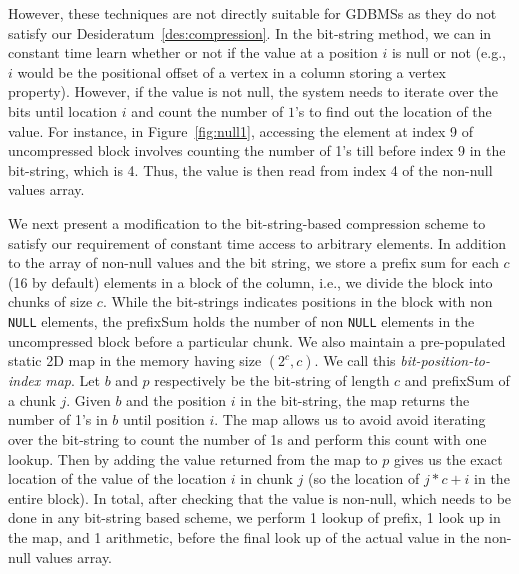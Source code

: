 However, these techniques are not directly suitable for GDBMSs as they do not satisfy our Desideratum~\ref{des:compression}. In the bit-string method, we can in constant time learn whether or not if the value at a position $i$ is null or not (e.g., $i$ would be the positional offset of a vertex in a column storing a vertex property). However, if the value is not null, the system needs to iterate over the bits until location $i$ and count the number of $1$'s to find out the location of the value. For instance, in Figure~\ref{fig:null1}, accessing the element at index 9 of uncompressed block involves counting the number of 1's till before index 9 in the bit-string, which is 4. Thus, the value is then read from index 4 of the non-null values array. 



We next present a modification to the bit-string-based compression scheme to satisfy our requirement of constant time access to arbitrary elements. In addition to the array of non-null values and the bit string, we store a prefix sum for each $c$ (16 by default) elements in a block of the column, i.e., we divide the block into chunks of size $c$. While the bit-strings indicates positions in the block with non \texttt{NULL} elements, the prefixSum holds the number of non \texttt{NULL} elements in the uncompressed block before a particular chunk. We also maintain a pre-populated static 2D map in the memory having size $(2^c, c)$. We call this \emph{bit-position-to-index map}. Let $b$ and $p$ respectively be the bit-string of length $c$ and prefixSum of a chunk $j$. Given $b$ and the position $i$ in the bit-string, the map returns the number of 1's in $b$ until position $i$. The map  allows us to avoid avoid iterating over the bit-string to count the number of 1s and perform this count with one lookup. Then by adding the value returned from the map to $p$ gives us the exact location of the value of the location $i$ in chunk $j$ (so the location of $j*c + i$ in the entire block). In total, after checking that the value is non-null, which needs to be done in any bit-string based scheme, we perform 1 lookup of prefix, 1 look up in the map, and 1 arithmetic, before the final look up of the actual value in the non-null values array.

